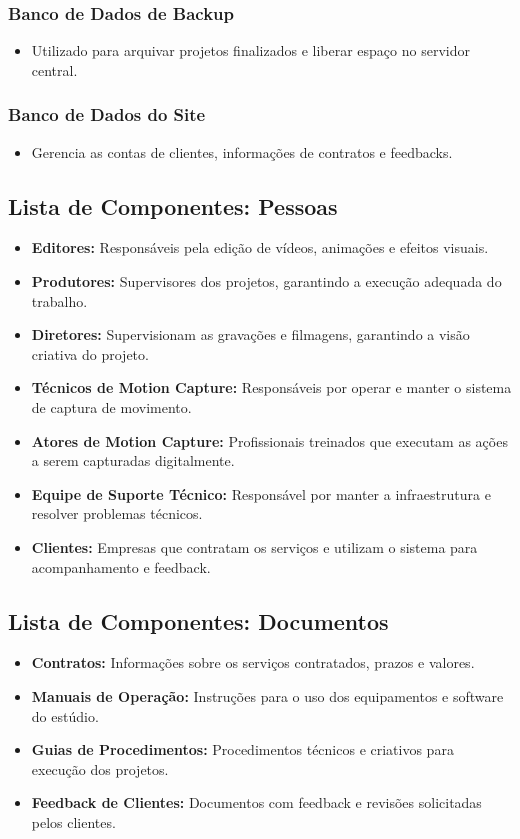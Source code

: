 \subsubsection{Banco de Dados de Backup}
\begin{itemize}
    \item Utilizado para arquivar projetos finalizados e liberar espaço no servidor central.
\end{itemize}

\subsubsection{Banco de Dados do Site}
\begin{itemize}
    \item Gerencia as contas de clientes, informações de contratos e feedbacks.
\end{itemize}

\subsection{Lista de Componentes: Pessoas}
\begin{itemize}
  \item \textbf{Editores:} Responsáveis pela edição de vídeos, animações e efeitos visuais.
  \item \textbf{Produtores:} Supervisores dos projetos, garantindo a execução adequada do trabalho.
  \item \textbf{Diretores:} Supervisionam as gravações e filmagens, garantindo a visão criativa do projeto.
  \item \textbf{Técnicos de Motion Capture:} Responsáveis por operar e manter o sistema de captura de movimento.
  \item \textbf{Atores de Motion Capture:} Profissionais treinados que executam as ações a serem capturadas digitalmente.
  \item \textbf{Equipe de Suporte Técnico:} Responsável por manter a infraestrutura e resolver problemas técnicos.
  \item \textbf{Clientes:} Empresas que contratam os serviços e utilizam o sistema para acompanhamento e feedback.
\end{itemize}

\subsection{Lista de Componentes: Documentos }
\begin{itemize}
  \item \textbf{Contratos:} Informações sobre os serviços contratados, prazos e valores.
  \item \textbf{Manuais de Operação:} Instruções para o uso dos equipamentos e software do estúdio.
  \item \textbf{Guias de Procedimentos:} Procedimentos técnicos e criativos para execução dos projetos.
  \item \textbf{Feedback de Clientes:} Documentos com feedback e revisões solicitadas pelos clientes.
\end{itemize}

